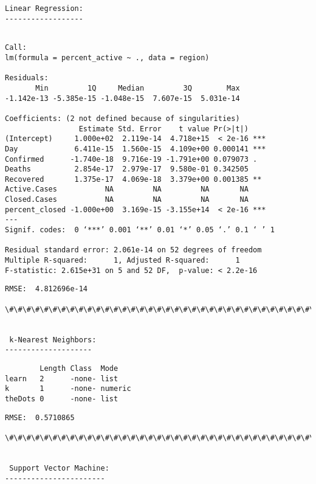 \documentclass[11pt]{article}
\begin{document}
    \begin{Verbatim}[commandchars=\\\{\}]


Linear Regression:
------------------
    \end{Verbatim}

    
    \begin{verbatim}

Call:
lm(formula = percent_active ~ ., data = region)

Residuals:
       Min         1Q     Median         3Q        Max 
-1.142e-13 -5.385e-15 -1.048e-15  7.607e-15  5.031e-14 

Coefficients: (2 not defined because of singularities)
                 Estimate Std. Error    t value Pr(>|t|)    
(Intercept)     1.000e+02  2.119e-14  4.718e+15  < 2e-16 ***
Day             6.411e-15  1.560e-15  4.109e+00 0.000141 ***
Confirmed      -1.740e-18  9.716e-19 -1.791e+00 0.079073 .  
Deaths          2.854e-17  2.979e-17  9.580e-01 0.342505    
Recovered       1.375e-17  4.069e-18  3.379e+00 0.001385 ** 
Active.Cases           NA         NA         NA       NA    
Closed.Cases           NA         NA         NA       NA    
percent_closed -1.000e+00  3.169e-15 -3.155e+14  < 2e-16 ***
---
Signif. codes:  0 ‘***’ 0.001 ‘**’ 0.01 ‘*’ 0.05 ‘.’ 0.1 ‘ ’ 1

Residual standard error: 2.061e-14 on 52 degrees of freedom
Multiple R-squared:      1,	Adjusted R-squared:      1 
F-statistic: 2.615e+31 on 5 and 52 DF,  p-value: < 2.2e-16

    \end{verbatim}

    
    \begin{Verbatim}[commandchars=\\\{\}]
RMSE:  4.812696e-14

\#\#\#\#\#\#\#\#\#\#\#\#\#\#\#\#\#\#\#\#\#\#\#\#\#\#\#\#\#\#\#\#\#\#\#\#\#\#\#\#\#\#\#\#\#\#\#\#\#\#\#\#\#\#\#\#\#\#\#\#\#


 k-Nearest Neighbors:
--------------------
    \end{Verbatim}

    
    \begin{verbatim}
        Length Class  Mode   
learn   2      -none- list   
k       1      -none- numeric
theDots 0      -none- list   
    \end{verbatim}

    
    \begin{Verbatim}[commandchars=\\\{\}]
RMSE:  0.5710865

\#\#\#\#\#\#\#\#\#\#\#\#\#\#\#\#\#\#\#\#\#\#\#\#\#\#\#\#\#\#\#\#\#\#\#\#\#\#\#\#\#\#\#\#\#\#\#\#\#\#\#\#\#\#\#\#\#\#\#\#\#


 Support Vector Machine:
-----------------------
    \end{Verbatim}
\end{document}
